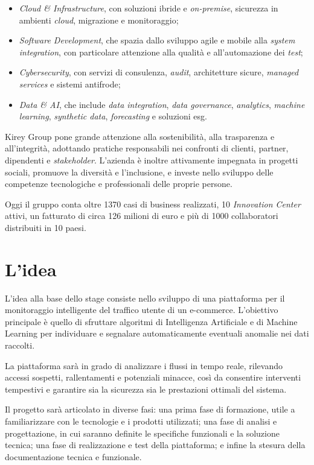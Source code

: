 \begin{itemize}
    \item \emph{Cloud \& Infrastructure}, con soluzioni ibride e \emph{on-premise}, sicurezza in ambienti \emph{cloud}, migrazione e monitoraggio;
    \item \emph{Software Development}, che spazia dallo sviluppo agile e mobile alla \emph{system integration}, con particolare attenzione alla qualità e all'automazione dei \emph{test};
    \item \emph{Cybersecurity}, con servizi di consulenza, \emph{audit}, architetture sicure, \emph{managed services} e sistemi antifrode;
    \item \emph{Data \& AI}, che include \emph{data integration}, \emph{data governance}, \emph{analytics}, \emph{machine learning}, \emph{synthetic data}, \emph{forecasting} e soluzioni \gls{esg}.
\end{itemize}

Kirey Group pone grande attenzione alla sostenibilità, alla trasparenza e all'integrità, adottando pratiche responsabili nei confronti di clienti, partner, dipendenti e \emph{stakeholder}. 
L'azienda è inoltre attivamente impegnata in progetti sociali, promuove la diversità e l'inclusione, e investe nello sviluppo delle competenze tecnologiche e professionali delle proprie persone.

Oggi il gruppo conta oltre 1370 casi di business realizzati, 10 \emph{Innovation Center} attivi, un fatturato di circa 126 milioni di euro e più di 1000 collaboratori distribuiti in 10 paesi.


\section{L'idea}

L'idea alla base dello stage consiste nello sviluppo di una piattaforma per il monitoraggio intelligente del traffico utente di un e-commerce. L'obiettivo principale è quello di sfruttare algoritmi di Intelligenza Artificiale e di Machine Learning per individuare e segnalare automaticamente eventuali anomalie nei dati raccolti.

La piattaforma sarà in grado di analizzare i flussi in tempo reale, rilevando accessi sospetti, rallentamenti e potenziali minacce, così da consentire interventi tempestivi e garantire sia la sicurezza sia le prestazioni ottimali del sistema.

Il progetto sarà articolato in diverse fasi: una prima fase di formazione, utile a familiarizzare con le tecnologie e i prodotti utilizzati; una fase di analisi e progettazione, in cui saranno definite le specifiche funzionali e la soluzione tecnica; una fase di realizzazione e test della piattaforma; e infine la stesura della documentazione tecnica e funzionale. 

